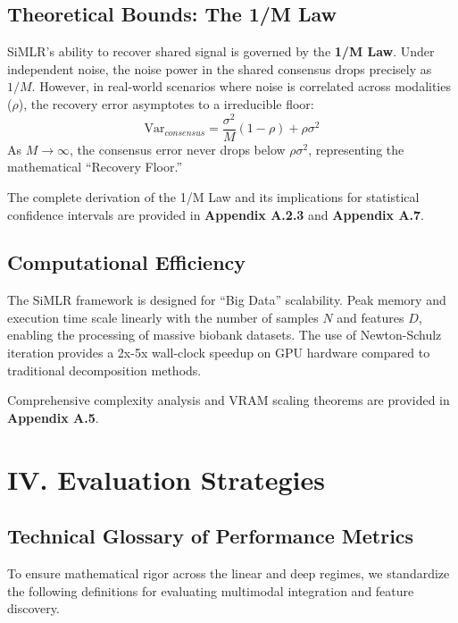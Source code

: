 \documentclass[
  letterpaper,
]{report}
\begin{document}
\subsection{Theoretical Bounds: The 1/M
Law}\label{theoretical-bounds-the-1m-law}

SiMLR's ability to recover shared signal is governed by the \textbf{1/M
Law}. Under independent noise, the noise power in the shared consensus
drops precisely as \(1/M\). However, in real-world scenarios where noise
is correlated across modalities (\(\rho\)), the recovery error
asymptotes to a irreducible floor:
\[ \text{Var}_{consensus} = \frac{\sigma^2}{M} (1 - \rho) + \rho \sigma^2 \]
As \(M \to \infty\), the consensus error never drops below
\(\rho \sigma^2\), representing the mathematical ``Recovery Floor.''

The complete derivation of the 1/M Law and its implications for
statistical confidence intervals are provided in \textbf{Appendix A.2.3}
and \textbf{Appendix A.7}.

\subsection{Computational Efficiency}\label{computational-efficiency}

The SiMLR framework is designed for ``Big Data'' scalability. Peak
memory and execution time scale linearly with the number of samples
\(N\) and features \(D\), enabling the processing of massive biobank
datasets. The use of Newton-Schulz iteration provides a 2x-5x wall-clock
speedup on GPU hardware compared to traditional decomposition methods.

Comprehensive complexity analysis and VRAM scaling theorems are provided
in \textbf{Appendix A.5}.

\section{IV. Evaluation Strategies}\label{iv.-evaluation-strategies}

\subsection{Technical Glossary of Performance
Metrics}\label{technical-glossary-of-performance-metrics}

To ensure mathematical rigor across the linear and deep regimes, we
standardize the following definitions for evaluating multimodal
integration and feature discovery.
\end{document}
